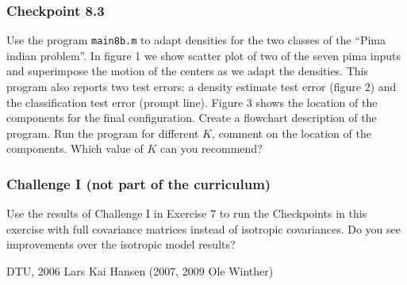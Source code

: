 \documentclass[12pt]{article}    %
\begin{document}
\subsubsection*{Checkpoint 8.3}

Use the program {\tt main8b.m} to adapt densities for the two
classes of the ``Pima indian problem''. In figure 1 we show
scatter plot of two of the seven pima inputs and superimpose the
motion of the centers as we adapt the densities. This program also
reports two test errors: a density estimate test error (figure 2)
and the classification test error (prompt line). Figure 3 shows
the location of the components for the final configuration. Create
a flowchart description of the program. Run the program for
different $K$, comment on the location of the components. Which
value of $K$ can you recommend?

\subsubsection*{Challenge I (not part of the curriculum)}

Use the results of Challenge I in Exercise 7 to run the Checkpoints in this exercise with full covariance matrices instead of isotropic covariances. Do you see improvements over the isotropic model results? 


\vspace{2cm} DTU, 2006 Lars Kai Hansen (2007, 2009 Ole Winther)
\end{document}
